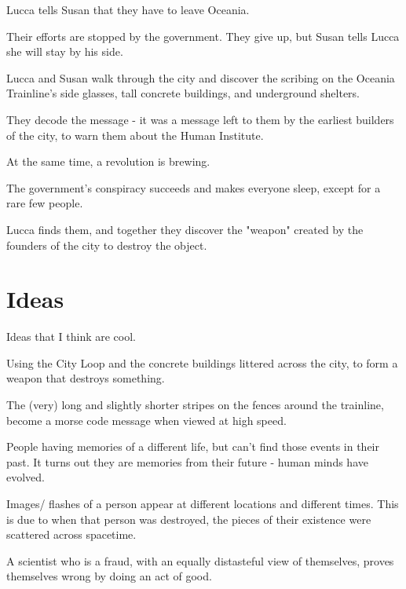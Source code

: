 \documentclass[11pt]{article}
\begin{document}
Lucca tells Susan that they have to leave Oceania.

Their efforts are stopped by the government. They give up, but Susan tells Lucca she will stay by his side.




Lucca and Susan walk through the city and discover the scribing on the Oceania Trainline's side glasses, tall concrete buildings, and underground shelters. 

They decode the message - it was a message left to them by the earliest builders of the city, to warn them about the Human Institute. 

At the same time, a revolution is brewing. 




The government's conspiracy succeeds and makes everyone sleep, except for a rare few people. 

Lucca finds them, and together they discover the "weapon" created by the founders of the city to destroy the object. 




\section{Ideas}
Ideas that I think are cool.

Using the City Loop and the concrete buildings littered across the city, to form a weapon that destroys something.

The (very) long and slightly shorter stripes on the fences around the trainline, become a morse code message when viewed at high speed.

People having memories of a different life, but can't find those events in their past. It turns out they are memories from their future - human minds have evolved.

Images/ flashes of a person appear at different locations and different times. This is due to when that person was destroyed, the pieces of their existence were scattered across spacetime. 

A scientist who is a fraud, with an equally distasteful view of themselves, proves themselves wrong by doing an act of good.
\newpage
\end{document}
